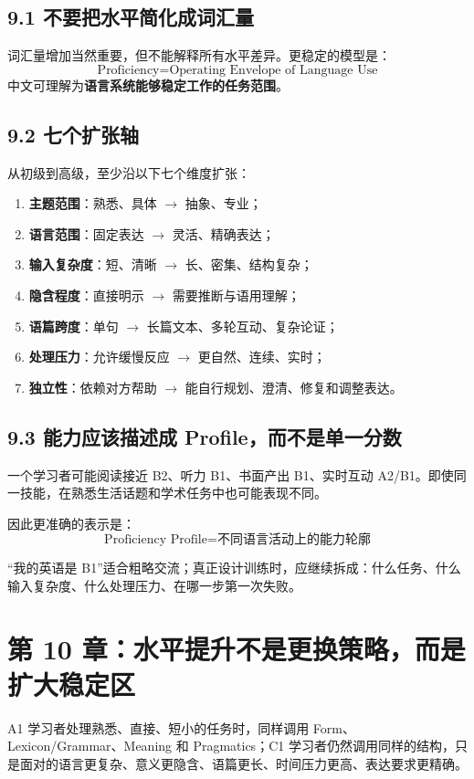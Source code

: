 \documentclass[11pt,a4paper]{ctexart}
\newcommand{\kw}[1]{\textbf{#1}}
\begin{document}
\subsection{9.1 不要把水平简化成词汇量}
词汇量增加当然重要，但不能解释所有水平差异。更稳定的模型是：
\[
\boxed{
\text{Proficiency}
=
\text{Operating Envelope of Language Use}
}
\]
中文可理解为\kw{语言系统能够稳定工作的任务范围}。

\subsection{9.2 七个扩张轴}
从初级到高级，至少沿以下七个维度扩张：
\begin{enumerate}
  \item \kw{主题范围}：熟悉、具体 $\rightarrow$ 抽象、专业；
  \item \kw{语言范围}：固定表达 $\rightarrow$ 灵活、精确表达；
  \item \kw{输入复杂度}：短、清晰 $\rightarrow$ 长、密集、结构复杂；
  \item \kw{隐含程度}：直接明示 $\rightarrow$ 需要推断与语用理解；
  \item \kw{语篇跨度}：单句 $\rightarrow$ 长篇文本、多轮互动、复杂论证；
  \item \kw{处理压力}：允许缓慢反应 $\rightarrow$ 更自然、连续、实时；
  \item \kw{独立性}：依赖对方帮助 $\rightarrow$ 能自行规划、澄清、修复和调整表达。
\end{enumerate}

\subsection{9.3 能力应该描述成 Profile，而不是单一分数}
一个学习者可能阅读接近 B2、听力 B1、书面产出 B1、实时互动 A2/B1。即使同一技能，在熟悉生活话题和学术任务中也可能表现不同。

因此更准确的表示是：
\[
\boxed{
\text{Proficiency Profile}
=
\text{不同语言活动上的能力轮廓}
}
\]

\begin{method}[诊断意义]
“我的英语是 B1”适合粗略交流；真正设计训练时，应继续拆成：什么任务、什么输入复杂度、什么处理压力、在哪一步第一次失败。
\end{method}

\section{第 10 章：水平提升不是更换策略，而是扩大稳定区}
A1 学习者处理熟悉、直接、短小的任务时，同样调用 Form、Lexicon/Grammar、Meaning 和 Pragmatics；C1 学习者仍然调用同样的结构，只是面对的语言更复杂、意义更隐含、语篇更长、时间压力更高、表达要求更精确。
\end{document}
